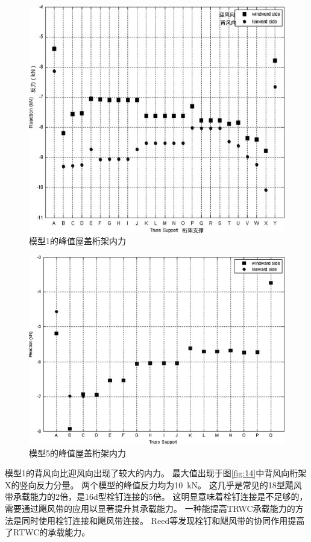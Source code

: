 \documentclass{ctexart}
\begin{document}
\begin{figure}
\centering
\includegraphics{./fig/15.jpg}
\caption{模型1的峰值屋盖桁架内力}
\label{fig:15}
\end{figure}

\begin{figure}
\centering
\includegraphics{./fig/16.jpg}
\caption{模型5的峰值屋盖桁架内力}
\label{fig:16}
\end{figure}



模型1的背风向比迎风向出现了较大的内力。
最大值出现于图\ref{fig:14}中背风向桁架X的竖向反力分量。
两个模型的峰值反力均为\SI{10}{kN}。
这几乎是常见的18型飓风带承载能力的2倍\cite{canfield1991uplift}，是16d型栓钉连接的5倍。
这明显意味着栓钉连接是不足够的，需要通过飓风带的应用以显著提升其承载能力。
一种能提高TRWC承载能力的方法是同时使用栓钉连接和飓风带连接。
Reed等\cite{reed1997uplift}发现栓钉和飓风带的协同作用提高了RTWC的承载能力。
\end{document}

